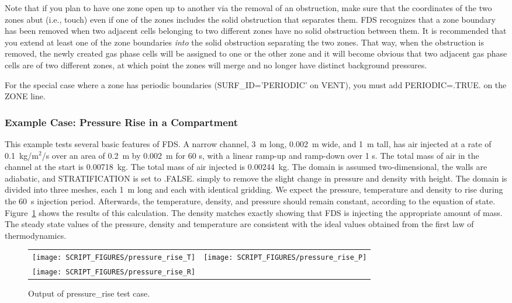 \documentclass[11pt]{book}
\begin{document}
Note that if you plan to have one zone open up to another via the removal of an obstruction, make sure that the coordinates of the two
zones abut (i.e., touch) even if one of the zones includes the solid obstruction that separates them. FDS recognizes that a zone boundary has been removed when
two adjacent cells belonging to two different zones have no solid obstruction between them. It is recommended that you extend at least one
of the zone boundaries {\em into} the solid obstruction separating the two zones. That way, when the obstruction is removed, the newly created
gas phase cells will be assigned to one or the other zone and it will become obvious that two adjacent gas phase cells are of two different zones, at
which point the zones will merge and no longer have distinct background pressures.

For the special case where a zone has periodic boundaries ({\ct SURF\_ID='PERIODIC'} on {\ct VENT}), you must add {\ct PERIODIC=.TRUE.} on the {\ct ZONE} line.


\subsubsection{Example Case: Pressure Rise in a Compartment}
\label{pressure_rise}

This example tests several basic features of FDS. A narrow channel, 3~m long, 0.002~m wide, and 1~m tall, has air injected at a rate of 0.1~kg/m$^2$/s over an area of 0.2~m by 0.002~m for 60 s, with a linear ramp-up and ramp-down over 1 s. The total mass of air in the channel at the start is 0.00718~kg. The total mass of air injected is 0.00244~kg. The domain is assumed two-dimensional, the walls are adiabatic, and {\ct STRATIFICATION} is set to {\ct .FALSE.} simply to remove the slight change in pressure and density with height. The domain is divided into three meshes, each 1~m long and each with identical gridding.  We expect the pressure, temperature and density to rise during the 60~s injection period. Afterwards, the temperature, density, and pressure should remain constant, according to the equation of state. Figure~\ref{pressure_rise_fig} shows the results of this calculation.  The density matches exactly showing that FDS is injecting the appropriate amount of mass. The steady state values of the pressure, density and temperature are consistent with the ideal values obtained from the first law of thermodynamics.

\begin{figure}[ht]
\begin{tabular*}{\textwidth}{lr}
\texttt{[image: SCRIPT\_FIGURES/pressure\_rise\_T]} &
\texttt{[image: SCRIPT\_FIGURES/pressure\_rise\_P]} \\
\texttt{[image: SCRIPT\_FIGURES/pressure\_rise\_R]} &
\end{tabular*}
\caption[Results of the {\ct pressure\_rise} test case]{Output of {\ct pressure\_rise} test case.}
\label{pressure_rise_fig}
\end{figure}
\end{document}
